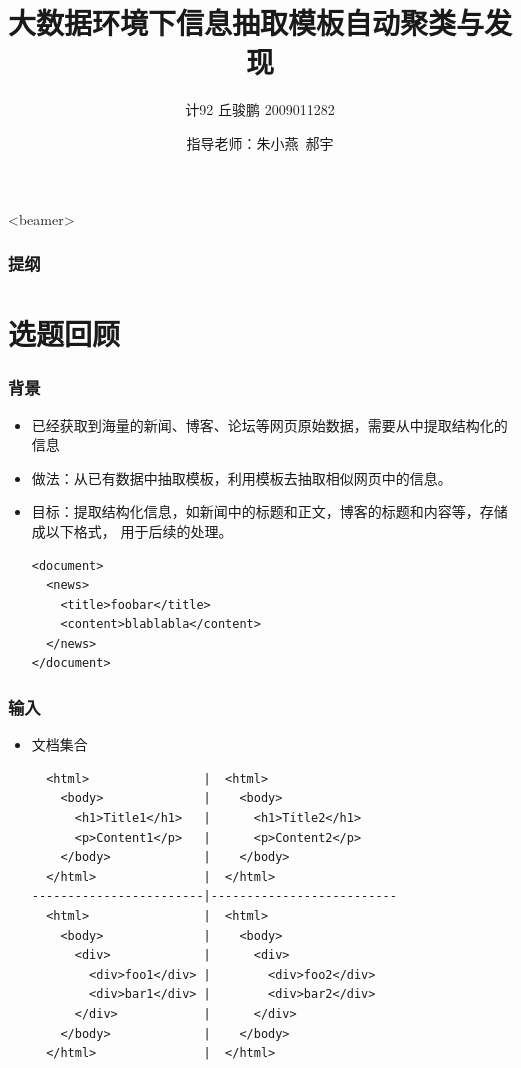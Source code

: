 \documentclass[11pt,presentation]{beamer}
\title{大数据环境下信息抽取模板自动聚类与发现}
\author{计92 丘骏鹏 2009011282}
\date{指导老师：朱小燕~郝宇}
\begin{document}
\maketitle



\begin{frame}<beamer>\frametitle{提纲}\tableofcontents\end{frame}
\section{选题回顾}
\label{sec-1}
\begin{frame}[fragile]
\frametitle{背景}
\label{sec-1-1}

\begin{itemize}
\item 已经获取到海量的新闻、博客、论坛等网页原始数据，需要从中提取结构化的信息
\item 做法：从已有数据中抽取模板，利用模板去抽取相似网页中的信息。
\item 目标：提取结构化信息，如新闻中的标题和正文，博客的标题和内容等，存储成以下格式，
  用于后续的处理。\tiny

\lstset{extendedchars=false,basicstyle=\ttfamily\footnotesize,escapechar=`,breaklines,language=nxml}
\begin{lstlisting}
<document>
  <news>
    <title>foobar</title>
    <content>blablabla</content>
  </news>
</document>
\end{lstlisting}
\end{itemize}
\end{frame}
\begin{frame}[fragile]
\frametitle{输入}
\label{sec-1-2}
\begin{itemize}

\item 文档集合\\
\label{sec-1-2-1}%
\lstset{extendedchars=false,basicstyle=\ttfamily\footnotesize,escapechar=`,breaklines,language=HTML}
\begin{lstlisting}
  <html>                |  <html>
    <body>              |    <body>
      <h1>Title1</h1>   |      <h1>Title2</h1>
      <p>Content1</p>   |      <p>Content2</p>
    </body>             |    </body>
  </html>               |  </html>
------------------------|--------------------------
  <html>                |  <html>
    <body>              |    <body>
      <div>             |      <div>
        <div>foo1</div> |        <div>foo2</div>
        <div>bar1</div> |        <div>bar2</div>
      </div>            |      </div>
    </body>             |    </body>
  </html>               |  </html>
\end{lstlisting}

\end{itemize} %
\end{frame}
\end{document}
